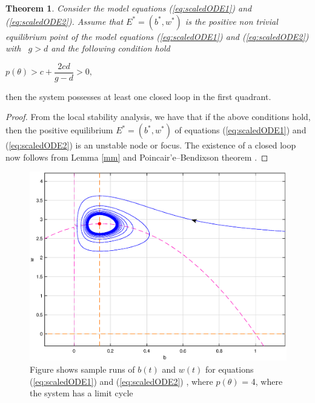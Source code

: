 \documentclass[12pt]{article}
\newtheorem{theorem}{Theorem}[section]
\begin{document}
\begin{theorem}
   Consider the model equations (\ref{eq:scaledODE1}) and
  (\ref{eq:scaledODE2}). Assume that $E^{\ast }=(b^{\ast },w^{\ast })$
  is the positive non trivial equilibrium point of the model equations
  (\ref{eq:scaledODE1}) and (\ref{eq:scaledODE2}) with \ $g>d$ and the
  following condition hold
\end{theorem}

\begin{center}
$%
p(\theta )>c+\dfrac{2cd}{g-d}>0,$
\end{center}

then the system possesses at least one closed loop in the first quadrant.

\begin{proof}
  From the local stability analysis, we have that if the above
  conditions hold, then the positive equilibrium
  $E^{\ast }=(b^{\ast },w^{\ast })$ of equations (\ref{eq:scaledODE1})
  and (\ref{eq:scaledODE2}) is an unstable node or focus. The
  existence of a closed loop now follows from Lemma \ref{mm} and
  Poincair'e--Bendixson theorem \cite{nonlinearChaos}.
\end{proof}

\begin{figure}[!htp]
\begin{center}
\includegraphics[scale=0.3]{img/lim.eps}  

\end{center}

\caption{Figure shows sample runs of $b(t)$ and $w(t)$ for equations
  (\ref{eq:scaledODE1}) and (\ref{eq:scaledODE2}) , where
  $p(\theta )$ = 4, where the system has a limit cycle }
      \label{fig:lim}
\end{figure}
\end{document}
